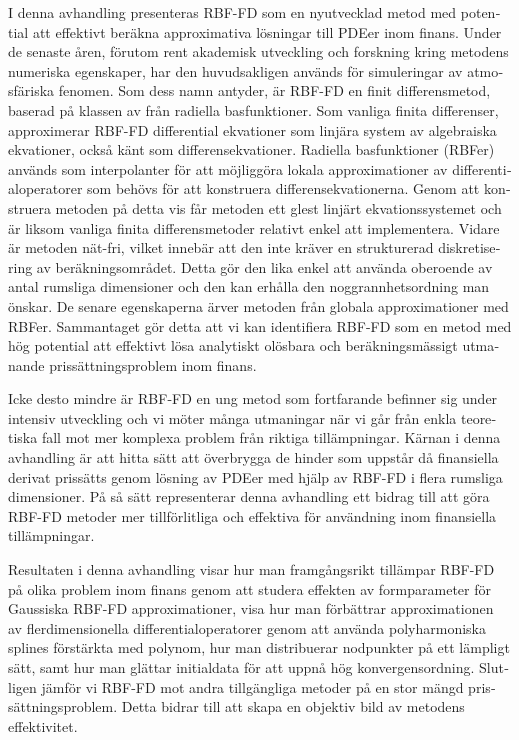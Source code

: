 \documentclass{UUThesisTemplate}
\begin{document}
\begin{swedish}
{\par
I denna avhandling presenteras RBF-FD som en nyutvecklad metod med potential att effektivt beräkna approximativa lösningar till PDEer inom finans.
Under de senaste åren, förutom rent akademisk utveckling och forskning kring metodens numeriska egenskaper, har den huvudsakligen används för simuleringar av atmosfäriska fenomen.
Som dess namn antyder, är RBF-FD en finit differensmetod, baserad på klassen av från radiella basfunktioner.
Som vanliga finita differenser, approximerar RBF-FD differential ekvationer som linjära system av algebraiska ekvationer, också känt som differensekvationer.
Radiella basfunktioner (RBFer) används som interpolanter för att möjliggöra lokala approximationer av differentialoperatorer som behövs för att konstruera differensekvationerna.
Genom att konstruera metoden på detta vis får metoden ett glest linjärt ekvationssystemet 
och är liksom vanliga finita differensmetoder relativt enkel att implementera.
Vidare är metoden nät-fri, vilket innebär att den inte kräver en strukturerad diskretisering av beräkningsområdet. Detta gör den lika enkel att använda oberoende av antal rumsliga dimensioner och den kan erhålla den noggrannhetsordning man önskar. De senare egenskaperna ärver metoden från globala approximationer med RBFer. Sammantaget gör detta att vi kan identifiera RBF-FD som en metod med hög potential att effektivt lösa analytiskt olösbara och beräkningsmässigt utmanande prissättningsproblem inom finans.

\par
Icke desto mindre är RBF-FD en ung metod som fortfarande befinner sig under intensiv utveckling
och vi möter många utmaningar när vi går från enkla teoretiska fall mot mer komplexa problem från riktiga tillämpningar.
Kärnan i denna avhandling är att hitta sätt att överbrygga de hinder som uppstår då finansiella derivat prissätts genom lösning av PDEer med hjälp av RBF-FD i flera rumsliga dimensioner.
På så sätt representerar denna avhandling ett bidrag till att göra RBF-FD metoder mer tillförlitliga och effektiva för användning inom finansiella tillämpningar.

\par
Resultaten i denna avhandling visar hur man framgångsrikt tillämpar RBF-FD på olika problem inom finans genom att studera effekten av formparameter för Gaussiska RBF-FD approximationer, visa hur man förbättrar approximationen av flerdimensionella differentialoperatorer genom att använda polyharmoniska splines förstärkta med polynom, hur man distribuerar nodpunkter på ett lämpligt sätt, samt hur man glättar initialdata för att uppnå hög konvergensordning. Slutligen jämför vi RBF-FD mot andra tillgängliga metoder på en stor mängd prissättningsproblem. Detta bidrar till att skapa en objektiv bild av metodens effektivitet.
}
\end{swedish}
\end{document}
